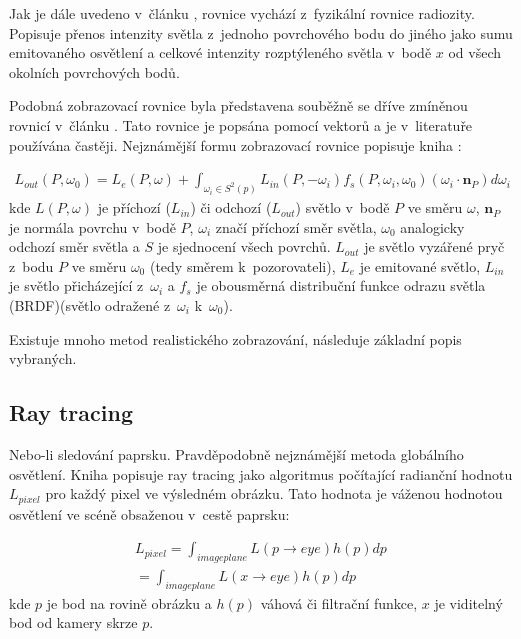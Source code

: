 Jak je dále uvedeno v~článku \cite{render_eq}, rovnice vychází z~fyzikální rovnice radiozity. Popisuje přenos intenzity světla z~jednoho povrchového bodu do jiného jako sumu emitovaného osvětlení a celkové intenzity rozptýleného světla v~bodě $x$ od všech okolních povrchových bodů.

Podobná zobrazovací rovnice byla představena souběžně se dříve zmíněnou rovnicí v~článku \cite{render_eq_2}. Tato rovnice je popsána pomocí vektorů a je v~literatuře používána častěji. Nejznámější formu zobrazovací rovnice popisuje kniha \cite{gfx_principles_practice}:

\begin{equation} \label{eq:render_2}
	\begin{gathered}
		L_{out}(P, \omega_0) = L_e(P, \omega) + \int_{\omega_i\in S^2(p)}L_{in}(P, -\omega_i)f_s(P, \omega_i, \omega_0)(\omega_i \cdot \textbf{n}_P)d\omega_i
	\end{gathered}
\end{equation}
kde $L(P, \omega)$ je příchozí ($L_{in}$) či odchozí ($L_{out}$) světlo v~bodě $P$ ve směru $\omega$, $\textbf{n}_P$ je normála povrchu v~bodě $P$, $\omega_i$ značí příchozí směr světla, $\omega_0$ analogicky odchozí směr světla a $S$ je sjednocení všech povrchů. $L_{out}$ je světlo vyzářené pryč z~bodu $P$ ve směru $\omega_0$ (tedy směrem k~pozorovateli), $L_e$ je emitované světlo, $L_{in}$ je světlo přicházející z~$\omega_i$ a $f_s$ je obousměrná distribuční funkce odrazu světla (BRDF)(světlo odražené z~$\omega_i$ k~$\omega_0$).

Existuje mnoho metod realistického zobrazování, následuje základní popis vybraných.

\subsection{Ray tracing}
Nebo-li sledování paprsku. Pravděpodobně nejznámější metoda globálního osvětlení. Kniha \cite{advanced_global} popisuje ray tracing jako algoritmus počítající radianční hodnotu $L_{pixel}$ pro každý pixel ve výsledném obrázku. Tato hodnota je váženou hodnotou osvětlení ve scéně obsaženou v~cestě paprsku:

\begin{equation} \label{eq:rt_1}
	\begin{gathered}
		L_{pixel} = \int_{imageplane}L(p \xrightarrow{} eye)h(p)dp \\= \int_{imageplane}L(x \xrightarrow{} eye)h(p)dp
	\end{gathered}
\end{equation}
kde $p$ je bod na rovině obrázku a $h(p)$ váhová či filtrační funkce, $x$ je viditelný bod od kamery skrze $p$.

